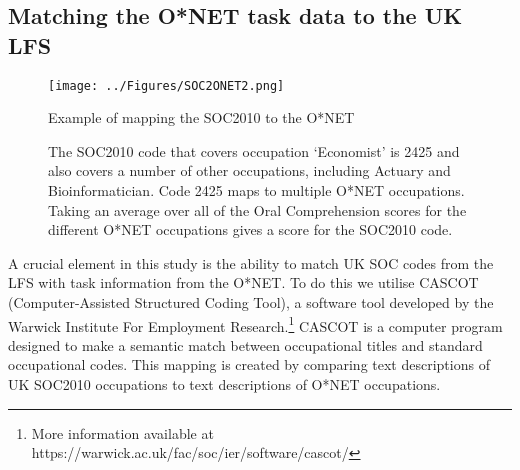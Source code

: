 \documentclass[preprint,12pt,authoryear]{elsarticle}
\begin{document}
\subsection{Matching the O*NET task data to the UK LFS}
\label{sec:matchLFSONET}

\begin{figure}[t!]
	\begin{center}
		\texttt{[image: ../Figures/SOC2ONET2.png]}
		\caption{Example of mapping the SOC2010 to the O*NET }
		\caption*{\footnotesize{The SOC2010 code that covers occupation `Economist' is 2425 and also covers a number of other occupations, including Actuary and Bioinformatician. Code 2425 maps to multiple O*NET occupations. Taking an average over all of the Oral Comprehension scores for the different O*NET occupations gives a score for the SOC2010 code. }}
		\label{fig:SOC2ONET}
	\end{center}
\end{figure}

A crucial element in this study is the ability to match UK SOC codes from the LFS with task information from the O*NET. To do this we utilise CASCOT (Computer-Assisted Structured Coding Tool), a software tool developed by the Warwick Institute For Employment Research.\footnote{More information available at https://warwick.ac.uk/fac/soc/ier/software/cascot/} CASCOT is a computer program designed to make a semantic match between occupational titles and standard occupational codes. This mapping is created by comparing text descriptions of UK SOC2010 occupations to text descriptions of O*NET occupations.
\end{document}
